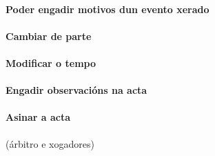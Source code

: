     \paragraph{Poder engadir motivos dun evento xerado}
    \paragraph{Cambiar de parte}
    \paragraph{Modificar o tempo}
    \paragraph{Engadir observacións na acta}
    \paragraph{Asinar a acta} (árbitro e xogadores)
